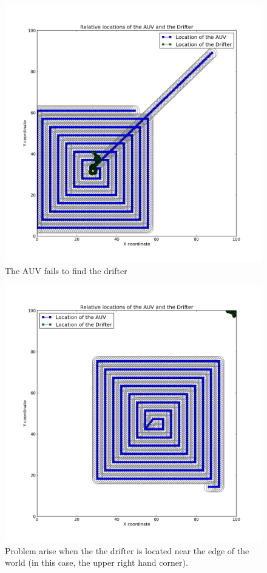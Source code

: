 \documentclass[a4paper, 11pt]{article} %
\begin{document}
\begin{figure}[H]
	\begin{center}
		\includegraphics[scale=0.30]{still_missing_2.png}
		\vspace{-20pt}
	\end{center}
\caption{The AUV fails to find the drifter \label{stillMisisng2}}
\end{figure}

\begin{figure}[H]
	\begin{center}
		\includegraphics[scale=0.30]{still_missing_3.png}
		\vspace{-20pt}
	\end{center}
\caption{Problem arise when the the drifter is located near the edge of the world (in this case, the upper right hand corner). \label{stillMisisng3}}
\end{figure}
\end{document}
